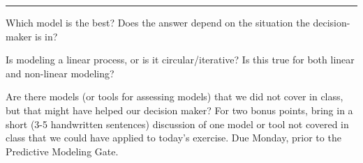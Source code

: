 \documentclass[11pt]{article}
\begin{document}
\hrule



\noindent Which model is the best? Does the answer depend on the situation the decision-maker is in?

\vfill

\noindent Is modeling a linear process, or is it circular/iterative? Is this true for both linear and non-linear modeling?

\vfill

\noindent Are there models (or tools for assessing models) that we did not cover in class, but that might have helped our decision maker? For two bonus points, bring in a short (3-5 handwritten sentences) discussion of one model or tool not covered in class that we could have applied to today's exercise. Due Monday, prior to the Predictive Modeling Gate.
\end{document}
